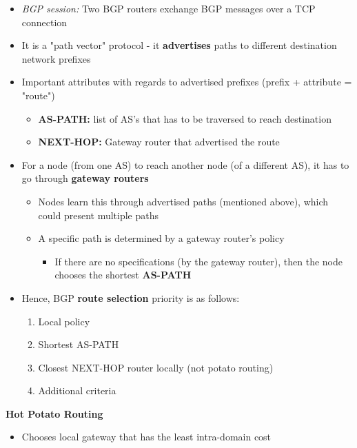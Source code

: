 \documentclass{article}
\begin{document}
\begin{itemize}
    \item \textit{BGP session:} Two BGP routers exchange BGP messages over a TCP connection
    \item It is a "path vector" protocol - it \textbf{advertises} paths to different destination
    network prefixes
    \item Important attributes with regards to advertised prefixes (prefix + attribute = "route")
    \begin{itemize}
        \item \textbf{AS-PATH:} list of AS's that has to be traversed to reach destination
        \item \textbf{NEXT-HOP:} Gateway router that advertised the route
    \end{itemize}
    \item For a node (from one AS) to reach another node (of a different AS), it has to go through 
    \textbf{gateway routers}
    \begin{itemize}
        \item Nodes learn this through advertised paths (mentioned above), which could present multiple
        paths
        \item A specific path is determined by a gateway router's policy
        \begin{itemize}
            \item If there are no specifications (by the gateway router), then the node chooses the
            shortest \textbf{AS-PATH}
        \end{itemize}
    \end{itemize}
    \item Hence, BGP \textbf{route selection} priority is as follows:
    \begin{enumerate}
        \item Local policy
        \item Shortest AS-PATH
        \item Closest NEXT-HOP router locally (not potato routing)
        \item Additional criteria
    \end{enumerate}
\end{itemize}
\textbf{Hot Potato Routing}
\begin{itemize}
    \item Chooses local gateway that has the least intra-domain cost
\end{itemize}
\newpage
\end{document}
